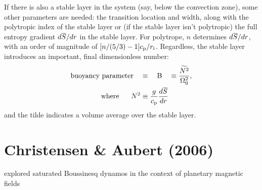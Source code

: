 \documentclass[12pt]{article} %
\begin{document}
If there is also a stable layer in the system (say, below the convection zone), some other parameters are needed: the transition location and width, along with the polytropic index of the stable layer or (if the stable layer isn't polytropic) the full entropy gradient $d\overline{S}/dr$ in the stable layer. For polytrope, $n$ determines $d\overline{S}/dr$, with an order of magnitude of $[n/(5/3)-1]c_{\rm{p}}/r_{\rm{i}}$. Regardless, the stable layer introduces an important, final dimensionless number:
\begin{align}
	\text{buoyancy parameter}\quad & \equiv \quad {\rm{B}} \quad \equiv \frac{\widetilde{N^2}}{\Omega_0^2},\\
	\text{where}\ \ \ \ \  N^2 &\equiv \frac{g}{c_{\rm{p}}}\frac{d\overline{S}}{dr}
\end{align}
and the tilde indicates a volume average over the stable layer. 

\section{Christensen \& Aubert (2006)}
\citet{Christensen2006} explored saturated Boussinesq dynamos in the context of planetary magnetic fields 


\end{document}
